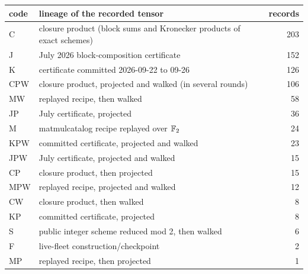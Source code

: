 \begin{tabular}{@{}llr@{}}\toprule code & lineage of the recorded tensor & records\\\midrule
C & closure product (block sums and Kronecker products of exact schemes) & 203\\
J & July 2026 block-composition certificate & 152\\
K & certificate committed 2026-09-22 to 09-26 & 126\\
CPW & closure product, projected and walked (in several rounds) & 106\\
MW & replayed recipe, then walked & 58\\
JP & July certificate, projected & 36\\
M & matmulcatalog recipe replayed over ${\mathbb{F}_2}$ & 24\\
KPW & committed certificate, projected and walked & 23\\
JPW & July certificate, projected and walked & 15\\
CP & closure product, then projected & 15\\
MPW & replayed recipe, projected and walked & 12\\
CW & closure product, then walked & 8\\
KP & committed certificate, projected & 8\\
S & public integer scheme reduced mod 2, then walked & 6\\
F & live-fleet construction/checkpoint & 2\\
MP & replayed recipe, then projected & 1\\
\bottomrule\end{tabular}
